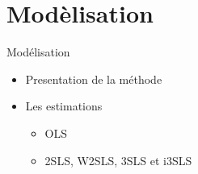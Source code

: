 \documentclass[11pt,ignorenonframetext,]{beamer}
\providecommand{\tightlist}{%
  \setlength{\itemsep}{0pt}\setlength{\parskip}{0pt}}
\begin{document}
\hypertarget{modelisation}{%
\section{Modèlisation}\label{modelisation}}

\begin{frame}{Modélisation}
\protect\hypertarget{modelisation}{}

\begin{itemize}
\tightlist
\item
  Presentation de la méthode
\item
  Les estimations

  \begin{itemize}
  \tightlist
  \item
    OLS
  \item
    2SLS, W2SLS, 3SLS et i3SLS
  \end{itemize}
\end{itemize}

\end{frame}
\end{document}

